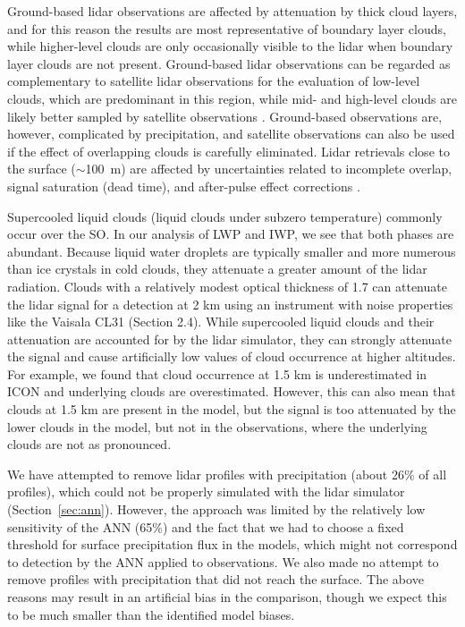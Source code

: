 \documentclass[draft]{agujournal2019}
\begin{document}
Ground-based lidar observations are affected by attenuation by thick cloud layers, and for this reason the results are most representative of boundary layer clouds, while higher-level clouds are only occasionally visible to the lidar when boundary layer clouds are not present. Ground-based lidar observations can be regarded as complementary to satellite lidar observations for the evaluation of low-level clouds, which are predominant in this region, while mid- and high-level clouds are likely better sampled by satellite observations \cite{mcerlich2021}. Ground-based observations are, however, complicated by precipitation, and satellite observations can also be used if the effect of overlapping clouds is carefully eliminated. Lidar retrievals close to the surface ($\sim$100~m) are affected by uncertainties related to incomplete overlap, signal saturation (dead time), and after-pulse effect corrections \cite{kuma2021}.

Supercooled liquid clouds (liquid clouds under subzero temperature) commonly occur over the SO. In our analysis of LWP and IWP, we see that both phases are abundant. Because liquid water droplets are typically smaller and more numerous than ice crystals in cold clouds, they attenuate a greater amount of the lidar radiation. Clouds with a relatively modest optical thickness of 1.7 can attenuate the lidar signal for a detection at 2 km using an instrument with noise properties like the Vaisala CL31 (Section 2.4). While supercooled liquid clouds and their attenuation are accounted for by the lidar simulator, they can strongly attenuate the signal and cause artificially low values of cloud occurrence at higher altitudes. For example, we found that cloud occurrence at 1.5 km is underestimated in ICON and underlying clouds are overestimated. However, this can also mean that clouds at 1.5 km are present in the model, but the signal is too attenuated by the lower clouds in the model, but not in the observations, where the underlying clouds are not as pronounced.

We have attempted to remove lidar profiles with precipitation (about 26\% of all profiles), which could not be properly simulated with the lidar simulator (Section~\ref{sec:ann}). However, the approach was limited by the relatively low sensitivity of the ANN (65\%) and the fact that we had to choose a fixed threshold for surface precipitation flux in the models, which might not correspond to detection by the ANN applied to observations. We also made no attempt to remove profiles with precipitation that did not reach the surface. The above reasons may result in an artificial bias in the comparison, though we expect this to be much smaller than the identified model biases.
\end{document}
